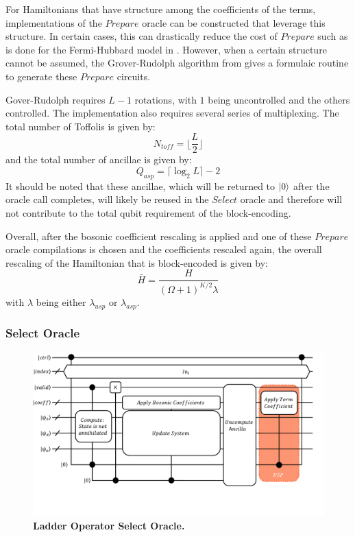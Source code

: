 For Hamiltonians that have structure among the coefficients of the terms, implementations of the $\textit{Prepare}$ oracle can be constructed that leverage this structure.
In certain cases, this can drastically reduce the cost of $\textit{Prepare}$ such as is done for the Fermi-Hubbard model in \cite{babbush2018encoding}.
However, when a certain structure cannot be assumed, the Grover-Rudolph algorithm from \cite{grover2002creating} gives a formulaic routine to generate these $\textit{Prepare}$ circuits.

Gover-Rudolph requires $L-1$ rotations, with $1$ being uncontrolled and the others controlled.
The implementation also requires several series of multiplexing.
The total number of Toffolis  is given by:
\begin{equation}
    N_{\textit{toff}} = \lfloor \frac{L}{2} \rfloor
\end{equation}
and the total number of ancillae is given by:
\begin{equation}
    Q_{asp} = \lceil \log_2{L} \rceil - 2
\end{equation}
It should be noted that these ancillae, which will be returned to $\ket{0}$ after the oracle call completes, will likely be reused in the $\textit{Select}$ oracle and therefore will not contribute to the total qubit requirement of the block-encoding.

Overall, after the bosonic coefficient rescaling is applied and one of these $Prepare$ oracle compilations is chosen and the coefficients rescaled again, the overall rescaling of the Hamiltonian that is block-encoded is given by:
\begin{equation}
    \bar{H} = \frac{H}{(\Omega + 1)^{K/2} \lambda}
\end{equation}
with $\lambda$ being either $\lambda_{usp}$ or $\lambda_{asp}$.

\subsubsection{Select Oracle}
\label{subsubsec:select}


\begin{figure}
    \centering
    \includegraphics[width=16cm]{figures/select-broad.pdf}
    \caption{\textbf{Ladder Operator Select Oracle.}
    }
    \label{fig:select-broad}
\end{figure}

